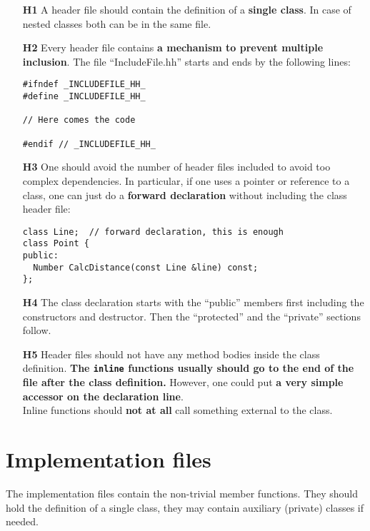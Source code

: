 \documentclass[a4paper,10pt]{article}
\begin{document}
\begin{itemize}
\item[\bf H1] A header file should contain the definition of a {\bf single
    class}. In case of nested classes both can be in the same file.
\item[\bf H2] Every header file contains {\bf a mechanism to prevent multiple
    inclusion}. The file ``IncludeFile.hh'' starts and ends by the
    following lines:%
    \begin{verbatim}
#ifndef _INCLUDEFILE_HH_
#define _INCLUDEFILE_HH_

// Here comes the code

#endif // _INCLUDEFILE_HH_
    \end{verbatim}
\item[\bf H3] One should avoid the number of header files included to avoid
  too complex dependencies. In particular, if one uses a pointer or reference
  to a class, one can just do a {\bf forward declaration} without including
  the class header file:
  \begin{verbatim}
class Line;  // forward declaration, this is enough
class Point {
public:
  Number CalcDistance(const Line &line) const;
};
  \end{verbatim}
\item[\bf H4] The class declaration starts with the ``public'' members
  first including the constructors and destructor. Then the ``protected''
  and the ``private'' sections follow.
\item[\bf H5] Header files should not have any method bodies inside the
  class definition. {\bf The {\tt inline} functions usually should go to
  the end of the file after the class definition.} However, one could put
  {\bf a very simple accessor on the declaration line}.\\
  Inline functions should {\bf not at all} call something external to the
  class.
\end{itemize}

\section{Implementation files}

The implementation files contain the non-trivial member functions. They
should hold the definition of a single class, they may contain auxiliary
(private) classes if needed.
\end{document}
